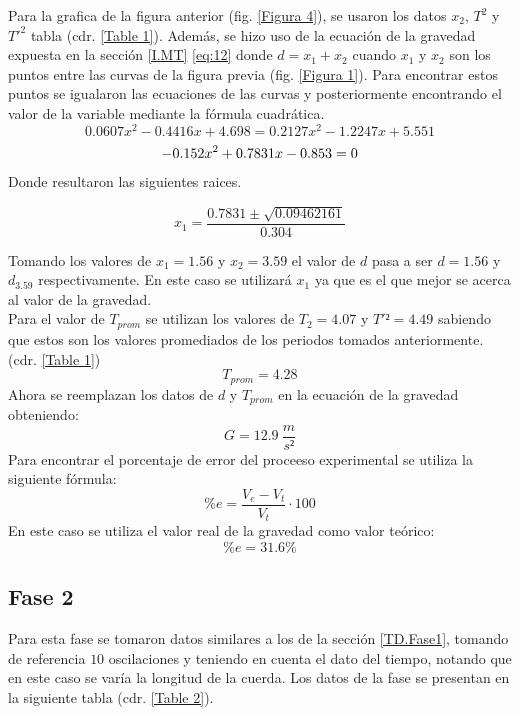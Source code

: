 \documentclass[spanish,notitlepage,letterpaper, 12pt]{article}
\begin{document}
Para la grafica de la figura anterior (fig. \ref{Figura 4}), se usaron los datos $x_2$, $T^2$ y ${T\prime}^2$ tabla (cdr. \ref{Table 1}). Además, se hizo uso de la ecuación de la gravedad expuesta en la sección \ref{I.MT} \eqref{eq:12} donde $d=x_1+x_2$ cuando $x_1$ y $x_2$ son los puntos entre las curvas de la figura previa (fig. \ref{Figura 1}). Para encontrar estos puntos se igualaron las ecuaciones de las curvas y posteriormente encontrando el valor de la variable mediante la fórmula cuadrática.
\begin{equation}
    0.0607x^2-0.4416x+4.698=0.2127x^2-1.2247x+5.551
\end{equation}
\begin{equation}
    -0.152x^2+0.7831x-0.853=0\\
\end{equation}
Donde resultaron las siguientes raices.

\begin{equation}
    x_1=\frac{0.7831\pm\sqrt{0.09462161}}{0.304}
\end{equation}

Tomando los valores de $x_1=1.56$ y $x_2=3.59$ el valor de $d$ pasa a ser $d=1.56$ y $d_3.59$ respectivamente. En este caso se utilizará $x_1$ ya que es el que mejor se acerca al valor de la gravedad.\\

Para el valor de $T_{prom}$ se utilizan los valores de $T_2=4.07$ y $T\prime²=4.49$ sabiendo que estos son los valores promediados de los periodos tomados anteriormente. (cdr. \ref{Table 1}) $$T_{prom}=4.28$$
Ahora se reemplazan los datos de $d$ y $T_{prom}$ en la ecuación de la gravedad obteniendo: $$G=12.9 \ \frac{m}{s²}$$
Para encontrar el porcentaje de error del proceeso experimental se utiliza la siguiente fórmula: $$\%e=\frac{V_e-V_t}{V_t}\cdot100$$ En este caso se utiliza el valor real de la gravedad como valor teórico: $$\%e=31.6\%$$
\subsection{Fase 2}
Para esta fase se tomaron datos similares a los de la sección \ref{TD.Fase1}, tomando de referencia $10$ oscilaciones y teniendo en cuenta el dato del tiempo, notando que en este caso se varía la longitud de la cuerda. Los datos de la fase se presentan en la siguiente tabla (cdr. \ref{Table 2}).
\end{document}
